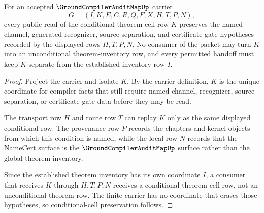 \begin{theorem}
\label{thm:ground-compiler-audit-map-conditional-cell-preservation}
For an accepted $\GroundCompilerAuditMapUp$ carrier
$$
G=(I,K,E,C,R,Q,F,X,H,T,P,N),
$$
every public read of the conditional theorem-cell row $K$ preserves the named channel, generated recognizer, source-separation, and certificate-gate hypotheses recorded by the displayed rows $H,T,P,N$. No consumer of the packet may turn $K$ into an unconditional theorem-inventory row, and every permitted handoff must keep $K$ separate from the established inventory row $I$.
\end{theorem}
\begin{proof}
Project the carrier and isolate $K$. By the carrier definition, $K$ is the unique coordinate for compiler facts that still require named channel, recognizer, source-separation, or certificate-gate data before they may be read.

The transport row $H$ and route row $T$ can replay $K$ only as the same displayed conditional row. The provenance row $P$ records the chapters and kernel objects from which this condition is named, while the local row $N$ records that the NameCert surface is the $\GroundCompilerAuditMapUp$ surface rather than the global theorem inventory.

Since the established theorem inventory has its own coordinate $I$, a consumer that receives $K$ through $H,T,P,N$ receives a conditional theorem-cell row, not an unconditional theorem row. The finite carrier has no coordinate that erases those hypotheses, so conditional-cell preservation follows.
\end{proof}

